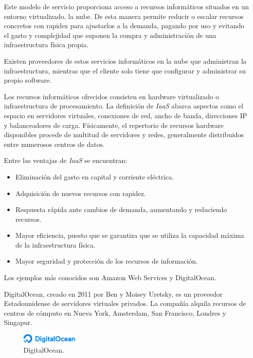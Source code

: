 Este modelo de servicio proporciona acceso a recursos informáticos situados en un entorno virtualizado, la nube. De esta manera permite reducir o escalar recursos  concretos con rapidez para ajustarlos a la demanda, pagando por uso y evitando el gasto y complejidad que suponen la compra y administración de una infraestructura física propia.

Existen proveedores de estos servicios informáticos en la nube que administran la infraestructura, mientras que el cliente solo tiene que configurar y administrar su propio software.

Los recursos informáticos ofrecidos consisten en hardware virtualizado o infraestructura de procesamiento. La definición de \textit{IaaS} abarca aspectos como el espacio en servidores virtuales, conexiones de red, ancho de banda, direcciones IP y balanceadores de carga. Físicamente, el repertorio de recursos hardware disponibles procede de multitud de servidores y redes, generalmente distribuidos entre numerosos centros de datos.

Entre las ventajas de \textit{IaaS} se encuentran:
\begin{itemize}
\item Eliminación del gasto en capital y corriente eléctrica.
\item Adquisición de nuevos recursos con rapidez.
\item Respuesta rápida ante cambios de demanda, aumentando y reduciendo recursos.
\item Mayor eficiencia, puesto que se garantiza que se utiliza la capacidad máxima de la infraestructura física.
\item Mayor seguridad y protección de los recursos de información.
\end{itemize}

Los ejemplos más conocidos son Amazon Web Services y DigitalOcean.

DigitalOcean, creado en 2011 por Ben y Moisey Uretsky, es un proveedor Estadounidense de servidores virtuales privados. La compañía alquila recursos de centros de cómputo en Nueva York, Amsterdam, San Francisco, Londres y Singapur.

\begin{figure}[H]
\centering
\includegraphics[width=0.25\textwidth]{images/figures/digitalocean.png}
\caption{DigitalOcean.\footnotemark}
\end{figure}


